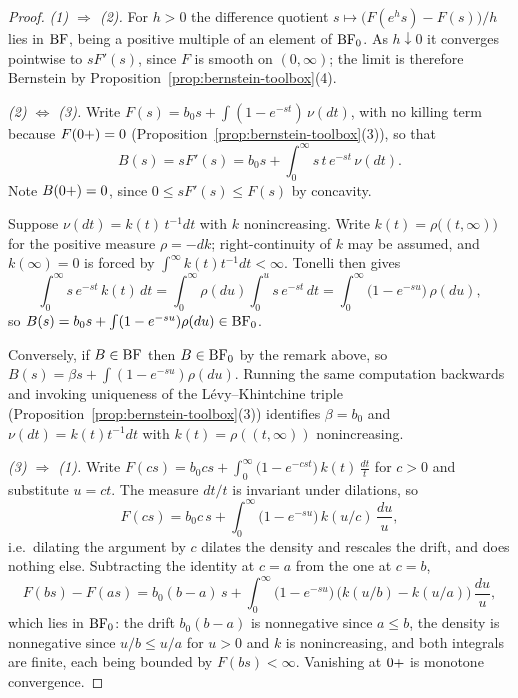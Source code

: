 \begin{proof}
\emph{(1) $\Rightarrow$ (2).} For $h > 0$ the difference quotient
$s \mapsto \bigl(F(e^h s) - F(s)\bigr)/h$ lies in $\mathrm{BF}$, being a positive multiple of an
element of $\mathrm{BF}_0$. As $h \downarrow 0$ it converges pointwise to $sF'(s)$, since $F$ is smooth
on $(0,\infty)$; the limit is therefore Bernstein by
Proposition~\ref{prop:bernstein-toolbox}(4).

\emph{(2) $\Leftrightarrow$ (3).} Write $F(s) = b_0 s + \int (1 - e^{-st})\,\nu(dt)$, with no
killing term because $F(0{+}) = 0$ (Proposition~\ref{prop:bernstein-toolbox}(3)), so that
\[
  B(s) = s F'(s) = b_0 s + \int_0^\infty s\,t\, e^{-st}\, \nu(dt).
\]
Note $B(0{+}) = 0$, since $0 \le sF'(s) \le F(s)$ by concavity.

Suppose $\nu(dt) = k(t)\,t^{-1}dt$ with $k$ nonincreasing. Write
$k(t) = \rho\bigl((t,\infty)\bigr)$ for the positive measure $\rho = -dk$; right-continuity of
$k$ may be assumed, and $k(\infty) = 0$ is forced by $\int^\infty k(t)t^{-1}dt < \infty$.
Tonelli then gives
\[
  \int_0^\infty s\, e^{-st}\, k(t)\, dt
  = \int_0^\infty \rho(du) \int_0^u s\,e^{-st}\,dt
  = \int_0^\infty \bigl(1 - e^{-su}\bigr)\,\rho(du),
\]
so $B(s) = b_0 s + \int (1 - e^{-su})\rho(du) \in \mathrm{BF}_0$.

Conversely, if $B \in \mathrm{BF}$ then $B \in \mathrm{BF}_0$ by the remark above, so
$B(s) = \beta s + \int (1 - e^{-su})\rho(du)$. Running the same computation backwards and
invoking uniqueness of the Lévy--Khintchine triple
(Proposition~\ref{prop:bernstein-toolbox}(3)) identifies $\beta = b_0$ and
$\nu(dt) = k(t)t^{-1}dt$ with $k(t) = \rho((t,\infty))$ nonincreasing.

\emph{(3) $\Rightarrow$ (1).} Write
$F(cs) = b_0 c s + \int_0^\infty \bigl(1 - e^{-cst}\bigr)\,k(t)\,\frac{dt}{t}$ for $c > 0$ and
substitute $u = ct$. The measure $dt/t$ is invariant under dilations, so
\[
  F(cs) = b_0 c\, s + \int_0^\infty \bigl(1 - e^{-su}\bigr)\, k(u/c)\,\frac{du}{u} ,
\]
i.e.\ dilating the argument by $c$ dilates the density and rescales the drift, and does
nothing else. Subtracting the identity at $c = a$ from the one at $c = b$,
\[
  F(bs) - F(as) = b_0 (b-a)\, s
    + \int_0^\infty \bigl(1 - e^{-su}\bigr)\,\bigl(k(u/b) - k(u/a)\bigr)\,\frac{du}{u},
\]
which lies in $\mathrm{BF}_0$: the drift $b_0(b-a)$ is nonnegative since $a \le b$, the density is
nonnegative since $u/b \le u/a$ for $u > 0$ and $k$ is nonincreasing, and both integrals are
finite, each being bounded by $F(bs) < \infty$. Vanishing at $0{+}$ is monotone convergence.
\end{proof}

